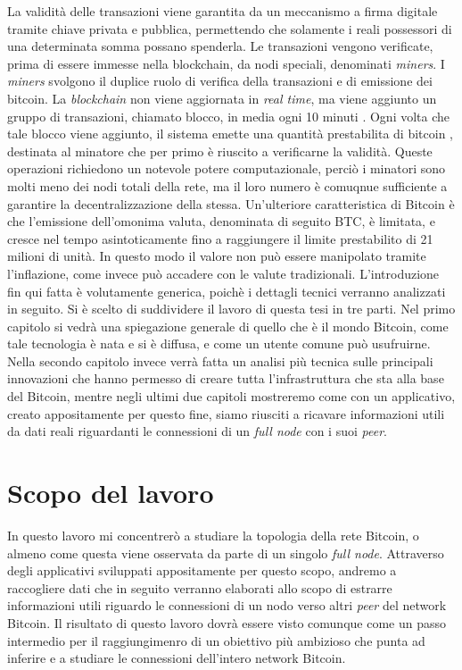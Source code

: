 La validit\`a delle transazioni viene garantita da un meccanismo a firma digitale tramite chiave privata e pubblica, permettendo che solamente i reali possessori di una determinata somma possano spenderla.  Le transazioni vengono verificate, prima di essere immesse nella blockchain, da nodi speciali, denominati \textit{miners}. I \textit{miners} svolgono il duplice ruolo di verifica della transazioni e di emissione dei bitcoin. La \textit{blockchain} non  viene  aggiornata  in  \textit{real time}, ma viene aggiunto un gruppo di transazioni, chiamato blocco, in media ogni 10 minuti . Ogni volta che tale blocco viene aggiunto, il sistema emette una quantit\`a prestabilita di bitcoin , destinata al minatore che per primo \`e riuscito a verificarne la validit\`a.  Queste operazioni richiedono un notevole potere computazionale, perci\`o i minatori sono molti meno dei nodi totali della rete, ma il loro numero \`e comuqnue sufficiente a garantire la decentralizzazione della stessa. Un'ulteriore caratteristica di Bitcoin \`e che l'emissione dell'omonima valuta, denominata di seguito BTC, \`e limitata, e cresce nel tempo asintoticamente fino a raggiungere il limite prestabilito di 21 milioni di unit\`a.  In questo modo il valore non pu\`o essere manipolato tramite l'inflazione, come invece pu\`o accadere con le valute tradizionali. L'introduzione fin qui fatta \`e  volutamente  generica, poich\`e i dettagli tecnici verranno analizzati in seguito.
Si \`e scelto di suddividere il lavoro di questa tesi in tre parti. Nel primo capitolo si vedr\`a una spiegazione generale di quello che \`e il mondo Bitcoin, come tale tecnologia \`e nata e si \`e diffusa, e come un utente comune pu\`o usufruirne. Nella secondo capitolo invece verr\`a fatta un analisi pi\`u tecnica sulle principali innovazioni che hanno permesso di creare tutta l'infrastruttura che sta alla base del Bitcoin, mentre negli ultimi due capitoli mostreremo come con un applicativo, creato appositamente per questo fine, siamo riusciti a ricavare informazioni utili da dati reali riguardanti le connessioni di un \textit{full node} con i suoi \textit{peer}.



\section*{Scopo del lavoro}
In questo lavoro mi concentrer\`o a studiare la topologia della rete Bitcoin, o almeno come questa viene osservata da parte di un singolo \textit{full node}. Attraverso degli applicativi sviluppati appositamente per questo scopo, andremo a raccogliere dati che in seguito verranno elaborati allo scopo di estrarre informazioni utili riguardo le connessioni di un nodo verso altri \textit{peer} del network Bitcoin. Il risultato di questo lavoro dovr\`a essere visto comunque come un passo intermedio per il raggiungimenro di un obiettivo pi\`u ambizioso che punta ad inferire e a studiare le connessioni dell'intero network Bitcoin.




